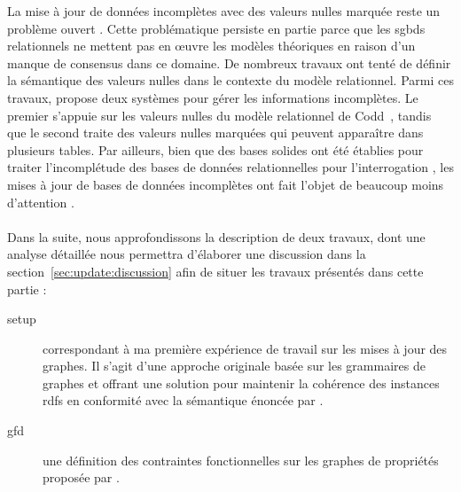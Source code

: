 La mise à jour de données incomplètes avec des valeurs nulles marquée reste un problème ouvert \cite{libkinIncompleteDataWhat2014,consoleCopingIncompleteData2020}.
Cette problématique persiste en partie parce que les \glspl{sgbd} relationnels ne mettent pas en œuvre les modèles théoriques en raison d'un manque de consensus dans ce domaine.
De nombreux travaux ont tenté de définir la sémantique des valeurs nulles dans le contexte du modèle relationnel.
Parmi ces travaux, \cite{imielinskiIncompleteInformationRelational1984} propose deux systèmes pour gérer les informations incomplètes.
Le premier s'appuie sur les valeurs nulles du modèle relationnel de Codd~\cite{coddRelationalModelData1970}, tandis que le second traite des valeurs nulles marquées qui peuvent apparaître dans plusieurs tables.
Par ailleurs, bien que des bases solides ont été établies pour traiter l'incomplétude des bases de données relationnelles pour l'interrogation \cite{zanioloDatabaseRelationsNull1984,imielinskiIncompleteInformationRelational1984,faginUpdatingLogicalDatabases1986,reiterSoundSometimesComplete1986,grahneProblemIncompleteInformation1991,bravoSemanticallyCorrectQuery2006,libkinSQLThreevaluedLogic2016,nikolaouQueryingIncompleteInformation2016,guagliardoCorrectnessSQLQueries2017}, les mises à jour de bases de données incomplètes ont fait l'objet de beaucoup moins d'attention \cite{abiteboulUpdateSemanticsIncomplete1985,faginSemanticsUpdatesDatabases1983,winslettModelbasedApproachUpdating1988,winslettUpdatingLogicalDatabases1990,degiacomoDealingInconsistenciesIncompleteness2009,degiacomoPracticalUpdateManagement2017,chabinConsistentUpdatingDatabases2020}.

\paragraph{}
Dans la suite, nous approfondissons la description de deux travaux, dont une analyse détaillée nous permettra d'élaborer une discussion dans la section~\ref{sec:update:discussion} afin de situer les travaux présentés dans cette partie :

\begin{description}    
    \item[\gls{setup}] correspondant à ma première expérience de travail sur les mises à jour des graphes.
    Il s'agit d'une approche originale basée sur les grammaires de graphes et offrant une solution pour maintenir la cohérence des instances \glspl{rdf} en conformité avec la sémantique énoncée par \cite{flourisFormalFoundationsRDF2013}.
    
    \item[\gls{gfd}] une définition des contraintes fonctionnelles sur les graphes de propriétés proposée par \cite{fanDependenciesGraphs2019}.
\end{description}
